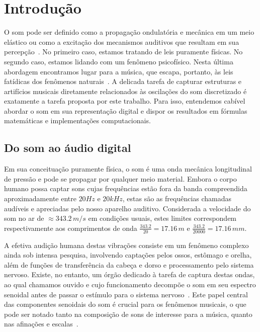 \chapter{Introdução} %
\label{cap:intro} 

O som pode ser definido como a propagação ondulatória e mecânica em um meio elástico
ou como a excitação dos mecanismos auditivos que resultam em sua percepção~\cite{Everest}. No primeiro
caso, estamos tratando de leis puramente físicas. No segundo caso, estamos lidando com um
fenômeno psicofísico. Nesta última abordagem encontramos lugar para a música, que escapa,
portanto, às leis fatídicas dos fenômenos naturais~\cite{Roederer}. A delicada tarefa de capturar estruturas
e artifícios musicais diretamente relacionados às oscilações do som discretizado
é exatamente a tarefa proposta por este trabalho. Para isso, entendemos cabível
abordar o som em sua representação digital e dispor os resultados em fórmulas matemáticas e implementações computacionais. 


    \section{Do som ao áudio digital}

Em sua conceituação puramente física, o som é uma onda mecânica longitudinal de pressão e pode se propagar por qualquer meio material.
Embora o corpo humano possa captar sons cujas frequências estão fora da banda compreendida aproximadamente entre $20Hz$ e $20 kHz$, estas são as frequências chamadas audíveis e apreciadas pelo nosso aparelho auditivo.
 Considerada a velocidade do som no ar de $\approx 343.2\,m/s$ em condições usuais,
estes limites correspondem respectivamente aos comprimentos de onda $\frac{343.2}{20} = 17.16\,m$ e $\frac{343.2}{20000}=17.16\,mm$.

A efetiva audição humana destas vibrações consiste em um fenômeno complexo ainda sob intensa pesquisa, involvendo captações pelos ossos, estômago e orelha, além de funções de transferência da cabeça e dorso e processamento pelo sistema nervoso. Existe, no entanto, um órgão dedicado à tarefa de captura destas ondas, ao qual chamamos ouvido e cujo funcionamento decompõe o som em seu espectro senoidal antes de passar o estímulo para o sistema nervoso~\cite{Roederer}. Este papel central das componentes senoidais do som é crucial para os fenômenos musicais, o que pode ser notado tanto na composição de sons de interesse para a música, quanto nas afinações e escalas~\cite{floEsp}.

